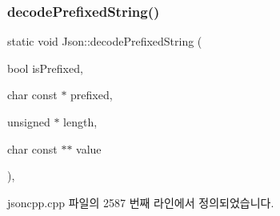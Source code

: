 \subsubsection{\texorpdfstring{decode\+Prefixed\+String()}{decodePrefixedString()}}
{\footnotesize\ttfamily static void Json\+::decode\+Prefixed\+String (\begin{DoxyParamCaption}\item[{bool}]{is\+Prefixed,  }\item[{char const $\ast$}]{prefixed,  }\item[{unsigned $\ast$}]{length,  }\item[{char const $\ast$$\ast$}]{value }\end{DoxyParamCaption})\hspace{0.3cm}{\ttfamily [inline]}, {\ttfamily [static]}}



jsoncpp.\+cpp 파일의 2587 번째 라인에서 정의되었습니다.



